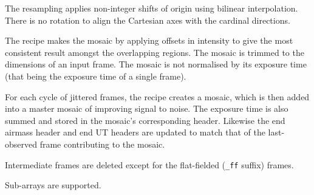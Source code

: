\documentclass[twoside,11pt,nolof]{starlink}
\begin{document}
{{{         \sstitem
         The resampling applies non-integer shifts of origin using
         bilinear interpolation.  There is no rotation to align the
         Cartesian axes with the cardinal directions.

         \sstitem
         The recipe makes the mosaic by applying offsets in intensity to
         give the most consistent result amongst the overlapping regions.
         The mosaic is trimmed to the dimensions of an input frame.  The
         mosaic is not normalised by its exposure time (that being the
         exposure time of a single frame).

         \sstitem
         For each cycle of jittered frames, the recipe creates a mosaic,
         which is then added into a master mosaic of improving signal to
         noise.  The exposure time is also summed and stored in the
	 mosaic's corresponding header.  Likewise the end airmass
	 header and end UT headers are updated to match that of the
	 last-observed frame contributing to the mosaic.

         \sstitem
         Intermediate frames are deleted except for the flat-fielded ({\tt\_ff}
         suffix) frames.

         \sstitem
         Sub-arrays are supported.
      }
   }
   \sstimplementationstatus{
      \sstitemlist{

}}}
\end{document}
